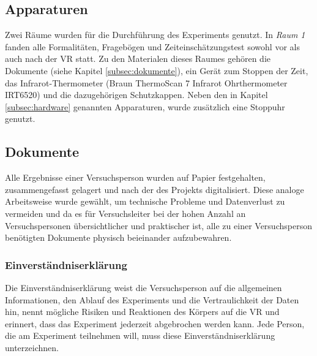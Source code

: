 \documentclass{Bericht}
\begin{document}
\subsection{Apparaturen}
Zwei Räume wurden für die Durchführung des Experiments genutzt. In  \textit{Raum 1} fanden alle Formalitäten, Fragebögen und Zeiteinschätzungstest sowohl vor als auch nach der VR statt. Zu den Materialen dieses Raumes gehören die Dokumente (siehe Kapitel \ref{subsec:dokumente}), ein Gerät zum Stoppen der Zeit, das Infrarot-Thermometer (Braun ThermoScan 7 Infrarot Ohrthermometer IRT6520) und die dazugehörigen Schutzkappen. Neben den in Kapitel \ref{subsec:hardware} genannten Apparaturen, wurde zusätzlich eine Stoppuhr genutzt. 


\label{subsec:dokumente}
\subsection{Dokumente}
Alle Ergebnisse einer Versuchsperson wurden auf Papier festgehalten, zusammengefasst gelagert und nach der des Projekts digitalisiert. Diese analoge Arbeitsweise wurde gewählt, um technische Probleme und Datenverlust zu vermeiden und da es für Versuchsleiter bei der hohen Anzahl an Versuchspersonen übersichtlicher und praktischer ist, alle zu einer Versuchsperson benötigten Dokumente physisch beieinander aufzubewahren.

\subsubsection{Einverständniserklärung}
Die Einverständniserklärung weist die Versuchsperson auf die allgemeinen Informationen, den Ablauf des Experiments und die Vertraulichkeit der Daten hin, nennt mögliche Risiken und Reaktionen des Körpers auf die VR und erinnert, dass das Experiment jederzeit abgebrochen werden kann. Jede Person, die am Experiment teilnehmen will, muss diese Einverständniserklärung unterzeichnen.
\end{document}
